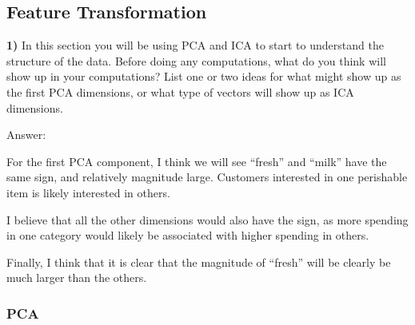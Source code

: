 \documentclass{article}
\begin{document}
    \subsection{Feature Transformation}\label{feature-transformation}

    \textbf{1)} In this section you will be using PCA and ICA to start to
understand the structure of the data. Before doing any computations,
what do you think will show up in your computations? List one or two
ideas for what might show up as the first PCA dimensions, or what type
of vectors will show up as ICA dimensions.

    Answer:

For the first PCA component, I think we will see ``fresh'' and ``milk''
have the same sign, and relatively magnitude large. Customers interested
in one perishable item is likely interested in others.

I believe that all the other dimensions would also have the sign, as
more spending in one category would likely be associated with higher
spending in others.

Finally, I think that it is clear that the magnitude of ``fresh'' will
be clearly be much larger than the others.

    \subsubsection{PCA}\label{pca}
\end{document}
